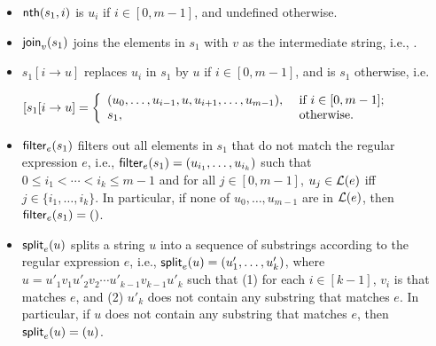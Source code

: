 \begin{itemize}
	\item ${\sf nth}(s_1, i)$ is $u_i$ if $i\in [0,m-1]$, and  undefined otherwise.
	\item $\mathsf{join}_v(s_1)$ joins the elements in $s_1$ with $v$ as the intermediate string, i.e., . 
	\item $s_1[i \rightarrow u]$ replaces $u_i$ in $s_1$ by $u$ if $i\in [0,m-1]$,  and is $s_1$ otherwise,  i.e.
	\begin{center}
	 $[s_1[i \rightarrow u] = 
	\left \{
	\begin{array}{l l}
	(u_0, \ldots, u_{i-1}, u, u_{i+1}, \ldots, u_{m-1}), & \mbox{ if } i\in [0,m-1]; \\
	s_1, & \mbox{ otherwise}.
	\end{array}
	\right.
	$    
	\end{center}
	\item ${\sf filter}_e(s_1)$ filters out all elements in $s_1$ that do not match the regular expression $e$, i.e., ${\sf filter}_e(s_1) = (u_{i_1}, \ldots, u_{i_k})$  such that $0\le i_1 < \cdots < i_k\le m-1$ and  for all $j \in [0,m-1]$, $u_j \in \mathcal{L}(e)$ iff $j \in \{i_1, \ldots, i_k\}$. %
	      In particular, if none of $u_0, \ldots, u_{m-1}$ are in $\mathcal{L}(e)$, then ${\sf filter}_e(s_1) = ()$. 
	\item $\mathsf{split}_e(u)$ splits a string $u$ into a sequence of substrings according to the regular expression $e$, i.e.,  $\mathsf{split}_e(u) = (u'_1, \ldots, u'_k)$, where $u = u'_1 v_1 u'_2 v_2 \cdots u'_{k-1}v_{k-1} u'_k$ such that (1) for each $i \in [k-1]$, $v_i$ is  that matches $e$, and (2) $u'_k$ does not contain any substring that matches $e$.
	      In particular, if $u$ does not contain any substring that matches $e$, then $\mathsf{split}_e(u) = (u)$.


\end{itemize}
